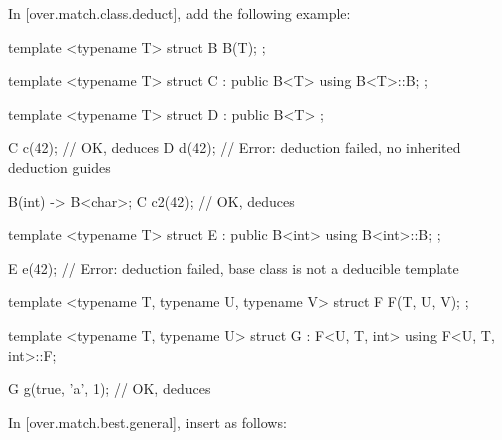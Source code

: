 In [over.match.class.deduct], add the following example:

\begin{adjustwidth}{0.5cm}{0.5cm}
\begin{addedblock}
\begin{example}
\begin{codeblock}
template <typename T> struct B {
  B(T);
};

template <typename T> struct C : public B<T> {
  using B<T>::B;
};

template <typename T> struct D : public B<T> {};

C c(42);  // OK, deduces 
D d(42);  // Error: deduction failed, no inherited deduction guides

B(int) -> B<char>;
C c2(42); // OK, deduces 

template <typename T> struct E : public B<int> {
  using B<int>::B;
};

E e(42);  // Error: deduction failed, base class is not a deducible template

template <typename T, typename U, typename V> struct F {
  F(T, U, V);
};

template <typename T, typename U> struct G : F<U, T, int> {
  using F<U, T, int>::F;
}

G g(true, 'a', 1); // OK, deduces 

\end{codeblock}
\end{example}
\end{addedblock}
\end{adjustwidth}

In [over.match.best.general], insert as follows:

